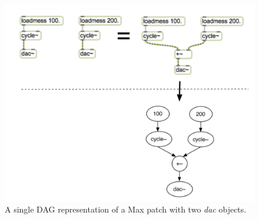 \documentclass[12pt]{report} 	%
\numberwithin{figure}{chapter}
\numberwithin{table}{chapter}
\numberwithin{equation}{chapter}
\begin{document}
\begin{flushleft}
\begin{figure}[h!]
\begin{center}
\includegraphics[scale=0.7]{MaxDAGs2DACs}
\caption[A single DAG with two \textit{dac\texttildelow{}} objects]{A single DAG representation of a Max patch with two \textit{dac\texttildelow{}} objects.}
\end{center}
\vspace{9pt}
\end{figure}


\end{flushleft}
\end{document}
